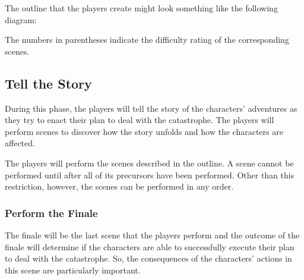 \documentclass[12pt, a5paper, parskip=half-, footheight=1.4cm]{scrartcl}
\begin{document}
The outline that the players create might look something like the following diagram:
\smallskip
\begin{center}
\end{center}
\smallskip
The numbers in parentheses indicate the difficulty rating of the corresponding scenes. 

\newpage

\subsection*{Tell the Story} \label{subsection:tell-the-story}
During this phase, the players will tell the story of the characters' adventures as they try to enact their plan to deal with the catastrophe.
The players will perform scenes to discover how the story unfolds and how the characters are affected.

The players will perform the scenes described in the outline.
A scene cannot be performed until after all of its precursors have been performed.
Other than this restriction, however, the scenes can be performed in any order.

\subsubsection*{Perform the Finale} \label{subsubsection:perform-the-finale}
The finale will be the last scene that the players perform and the outcome of the finale will determine if the characters are able to successfully execute their plan to deal with the catastrophe.
So, the consequences of the characters' actions in this scene are particularly important.
\end{document}
